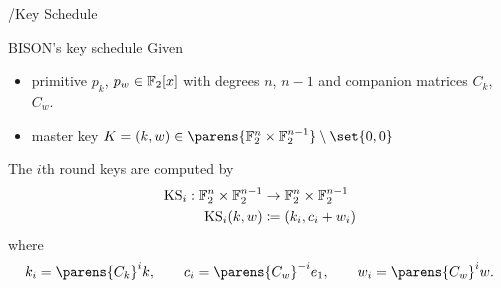 \begin{frame}{\bison/}{Key Schedule\vpPp}
    \vspace{-45pt}
    \begin{minipage}[t][150pt][t]{0.985\textwidth}
        \begin{block}{BISON's key schedule}
            \vspace{0.5\baselineskip}
            Given
            \begin{itemize}
                \item primitive $p_k$, $p_w \in \mathbb{F}_2[x]$ with degrees $n$, $n-1$ and companion matrices $C_k$, $C_w$.
                \item master key $K = (k, w) \in \parens{\F_2^n \times \F_2^{n-1}} \setminus \set{0,0}$
            \end{itemize}
            The $i$th round keys are computed by
            \begin{align*}
                \mathrm{KS}_i : \mathbb{F}_2^n \times \mathbb{F}_2^{n-1} &\to \mathbb{F}_2^n \times \mathbb{F}_2^{n-1} \\
                \mathrm{KS}_i(k, w) &\coloneqq (k_i, c_i + w_i)
            \end{align*}
            where \begin{equation*}
                    k_i = \parens{C_k}^i k, \qquad
                    c_i = \parens{C_w}^{-i} e_1, \qquad
                    w_i = \parens{C_w}^i w.
                \end{equation*}
        \end{block}
    \end{minipage}
\end{frame}
